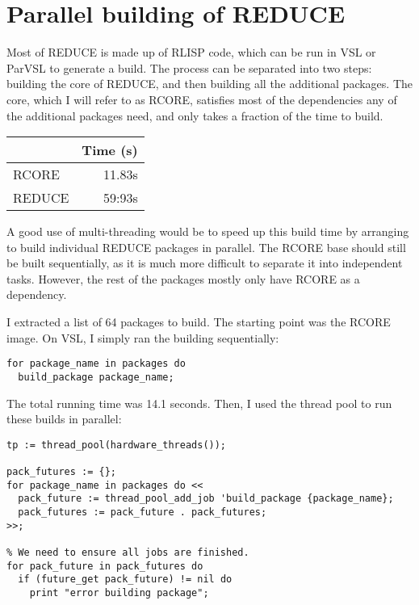 \section{Parallel building of REDUCE}

Most of REDUCE is made up of RLISP code, which can be run in VSL or ParVSL
to generate a build. The process can be separated into two steps:
building the core of REDUCE, and then building all the additional packages.
The core, which I will refer to as RCORE, satisfies most of the dependencies
any of the additional packages need, and only takes a fraction of the time
to build.

\begin{table}[H]
\centering
\begin{tabular}{lr}
 & Time (s)\\
\hline
RCORE & 11.83s\\
REDUCE & 59:93s\\
\end{tabular}
\end{table}

A good use of multi-threading would be to speed up this build time by
arranging to build individual REDUCE packages in parallel. The RCORE base
should still be built sequentially, as it is much more difficult to
separate it into independent tasks. However, the rest of the packages mostly
only have RCORE as a dependency.

I extracted a list of 64 packages to build. The starting point was the
RCORE image. On VSL, I simply ran the building sequentially:

\begin{verbatim}
for package_name in packages do
  build_package package_name;
\end{verbatim}

The total running time was 14.1 seconds. Then, I used the thread pool
to run these builds in parallel:

\begin{verbatim}
tp := thread_pool(hardware_threads());

pack_futures := {};
for package_name in packages do <<
  pack_future := thread_pool_add_job 'build_package {package_name};
  pack_futures := pack_future . pack_futures;
>>;

% We need to ensure all jobs are finished.
for pack_future in pack_futures do
  if (future_get pack_future) != nil do
    print "error building package";
\end{verbatim}


